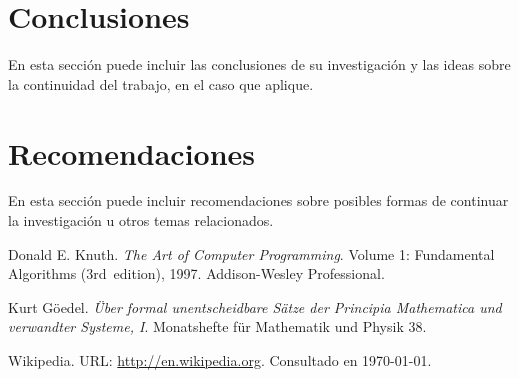 \documentclass[a4paper,10pt]{article}
\begin{document}



\section{Conclusiones}\label{sec:conc}

  En esta sección puede incluir las conclusiones de su investigación y las ideas
  sobre la continuidad del trabajo, en el caso que aplique.




\section{Recomendaciones}\label{sec:rec}

  En esta sección puede incluir recomendaciones sobre posibles formas de continuar
  la investigación u otros temas relacionados.




\begin{thebibliography}{99}
	 Donald E. Knuth. \emph{The Art of Computer Programming}.
		Volume 1: Fundamental Algorithms (3rd~edition), 1997.
		Addison-Wesley Professional.

	 Kurt Göedel. \emph{Über formal unentscheidbare Sätze der
		Principia Mathematica und verwandter Systeme, I}.
		Monatshefte für Mathematik und Physik 38.

	 Wikipedia. URL: \href{http://en.wikipedia.org}
	  {http://en.wikipedia.org}.
		Consultado en \today.

\end{thebibliography}


\label{end}
\end{document}
